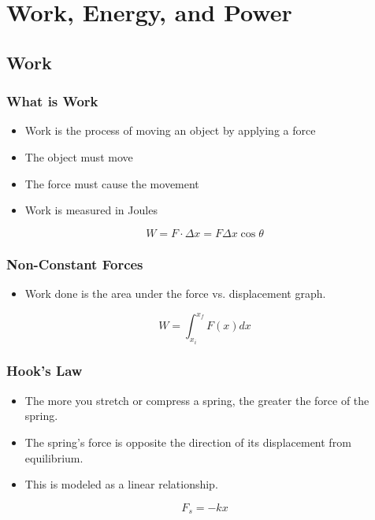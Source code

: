 \documentclass[../Notes.tex]{subfiles}
\begin{document}
\section{Work, Energy, and Power}

\subsection{Work}

\subsubsection{What is Work}
\begin{itemize}
	\item Work is the process of moving an object by applying a force
	\item The object must move
	\item The force must cause the movement
	\item Work is measured in Joules
\end{itemize}
\begin{equation*}
W = F \cdot \Delta x = F \Delta x \cos \theta 
\end{equation*}

\subsubsection{Non-Constant Forces}
\begin{itemize}
	\item Work done is the area under the force vs. displacement graph.
\end{itemize}
\begin{equation*}
W = \int_{x_i}^{x_f} F(x)dx
\end{equation*}

\subsubsection{Hook's Law}
\begin{itemize}
	\item The more you stretch or compress a spring, the greater the force of the spring.
	\item The spring's force is opposite the direction of its displacement from equilibrium.
	\item This is modeled as a linear relationship.
\end{itemize}
\begin{equation*}
F_s = -k x
\end{equation*}
\end{document}
